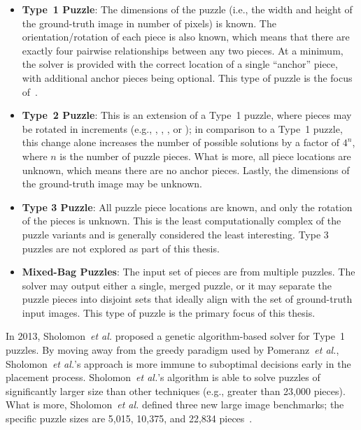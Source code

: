 \begin{itemize}

	\item \textbf{Type~1 Puzzle}: The dimensions of the puzzle (i.e., the width and height of the ground-truth image in number of pixels) is known.  The orientation/rotation of each piece is also known, which means that there are exactly four pairwise relationships between any two pieces.  At a minimum, the solver is provided with the correct location of a single ``anchor'' piece, with additional anchor pieces being optional.  This type of puzzle is the focus of~\cite{cho2010, pomeranz2011}.
	
	\item \textbf{Type~2 Puzzle}: This is an extension of a Type~1 puzzle, where pieces may be rotated in  increments (e.g., , , , or ); in comparison to a Type~1 puzzle, this change alone increases the number of possible solutions by a factor of $4^n$, where $n$ is the number of puzzle pieces.  What is more, all piece locations are unknown, which means there are no anchor pieces.  Lastly, the dimensions of the ground-truth image may be unknown.
	
	\item \textbf{Type 3 Puzzle}: All puzzle piece locations are known, and only the rotation of the pieces is unknown.  This is the least computationally complex of the puzzle variants and is generally considered the least interesting.  Type 3 puzzles are not explored as part of this thesis.
	
	\item \textbf{Mixed-Bag Puzzles}: The input set of pieces are from multiple puzzles.  The solver may output either a single, merged puzzle, or it may separate the puzzle pieces into disjoint sets that ideally align with the set of ground-truth input images.  This type of puzzle is the primary focus of this thesis.

\end{itemize}

In 2013, Sholomon~\textit{et al.}\cite{sholomon2013} proposed a genetic algorithm-based solver for Type~1 puzzles.  By moving away from the greedy paradigm used by Pomeranz~\textit{et al.}, Sholomon~\textit{et al.}'s approach is more immune to suboptimal decisions early in the placement process. Sholomon~\textit{et al.}'s algorithm is able to solve puzzles of significantly larger size than other techniques (e.g., greater than 23,000 pieces).  What is more, Sholomon~\textit{et al.} defined three new large image benchmarks; the specific puzzle sizes are 5,015, 10,375, and 22,834 pieces~\cite{sholomonBenchmarkImages}.


